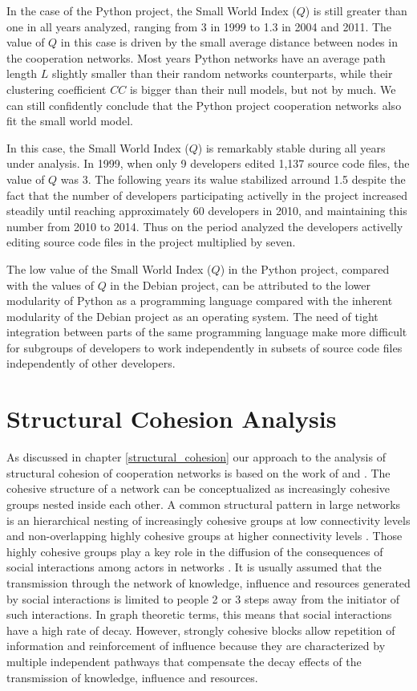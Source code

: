 

In the case of the Python project, the Small World Index ($Q$) is still greater than one in all years analyzed, ranging from 3 in 1999 to 1.3 in 2004 and 2011. The value of $Q$ in this case is driven by the small average distance between nodes in the cooperation networks. Most years Python networks have an average path length $L$ slightly smaller than their random networks counterparts, while their clustering coefficient $CC$ is bigger than their null models, but not by much. We can still confidently conclude that the Python project cooperation networks also fit the small world model.

In this case, the Small World Index ($Q$) is remarkably stable during all years under analysis. In 1999, when only 9 developers edited 1,137 source code files, the value of $Q$ was 3. The following years its walue stabilized arround 1.5 despite the fact that the number of developers participating activelly in the project increased steadily until reaching approximately 60 developers in 2010, and maintaining this number from 2010 to 2014. Thus on the period analyzed the developers activelly editing source code files in the project multiplied by seven.

The low value of the Small World Index ($Q$) in the Python project, compared with the values of $Q$ in the Debian project, can be attributed to the lower modularity of Python as a programming language compared with the inherent modularity of the Debian project as an operating system. The need of tight integration between parts of the same programming language make more difficult for subgroups of developers to work independently in subsets of source code files independently of other developers. 

\section{Structural Cohesion Analysis}

As discussed in chapter \ref{structural_cohesion} our approach to the analysis of structural cohesion of cooperation networks is based on the work of \citet{white:2001} and \citet{moody:2003}. The cohesive structure of a network can be conceptualized as increasingly cohesive groups nested inside each other. A common structural pattern in large networks is an hierarchical nesting of increasingly cohesive groups at low connectivity levels and non-overlapping highly cohesive groups at higher connectivity levels \citep[112]{moody:2003}. Those highly cohesive groups play a key role in the diffusion of the consequences of social interactions among actors in networks \citep[355-356]{white:2001}. It is usually assumed that the transmission through the network of knowledge, influence and resources generated by social interactions is limited to people 2 or 3 steps away from the initiator of such interactions. In graph theoretic terms, this means that social interactions have a high rate of decay. However, strongly cohesive blocks allow repetition of information and reinforcement of influence because they are characterized by multiple independent pathways that compensate the decay effects of the transmission of knowledge, influence and resources.


